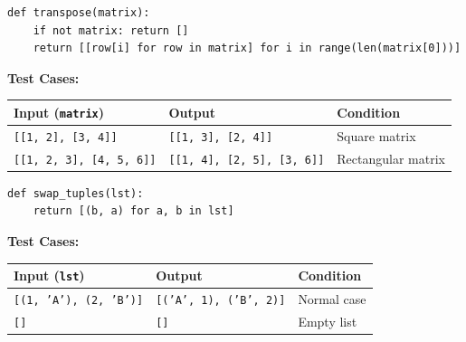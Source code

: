 \begin{solutionbox}
\begin{lstlisting}[language=Python3]
def transpose(matrix):
    if not matrix: return []
    return [[row[i] for row in matrix] for i in range(len(matrix[0]))]
\end{lstlisting}
\textbf{Test Cases:}
\begin{table}[H]
    \centering\sffamily
    \begin{tabular}{llp{5cm}}
    \toprule
    \textbf{Input (\texttt{matrix})} & \textbf{Output} & \textbf{Condition} \\
    \midrule
    \texttt{[[1, 2], [3, 4]]} & \texttt{[[1, 3], [2, 4]]} & Square matrix \\
    \texttt{[[1, 2, 3], [4, 5, 6]]} & \texttt{[[1, 4], [2, 5], [3, 6]]} & Rectangular matrix \\
    \bottomrule
    \end{tabular}
\end{table}
\end{solutionbox}

\begin{solutionbox}
\begin{lstlisting}[language=Python3]
def swap_tuples(lst):
    return [(b, a) for a, b in lst]
\end{lstlisting}
\textbf{Test Cases:}
\begin{table}[H]
    \centering\sffamily
    \begin{tabular}{llp{5cm}}
    \toprule
    \textbf{Input (\texttt{lst})} & \textbf{Output} & \textbf{Condition} \\
    \midrule
    \texttt{[(1, 'A'), (2, 'B')]} & \texttt{[('A', 1), ('B', 2)]} & Normal case \\
    \texttt{[]} & \texttt{[]} & Empty list \\
    \bottomrule
    \end{tabular}
\end{table}
\end{solutionbox}


